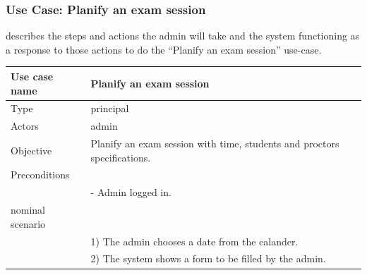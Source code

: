 \documentclass[]{uc2pfecaneva}
\begin{document}
    \begin{table}[t]
        \raggedright\subsubsection{Use Case: Planify an exam session}
        describes the steps and actions the admin will take and the system functioning as a response to
        those actions to do the “Planify an exam session” use-case.\linebreak \\
        \begin{tabularx}{\textwidth}{|l|X|}
            \hline
            Use case name         & Planify an exam session                                                                                                                                            \\ \hline
            Type                  & principal                                                                                                                                                         \\ \hline
            Actors                & admin                                                                                                                                                             \\ \hline
            Objective             & Planify an exam session with time, students and proctors specifications.                                                                                           \\ \hline
            Preconditions         &                                                                                                                                                                   \\
            & - Admin logged in.                                                                                                                                                \\\hline
            nominal scenario      &                                                                                                                                                                   \\
            & 1) The admin chooses a date from the calander.                                                                                                           \\
            & 2) The system shows a form to be filled by the admin.                                                                                                             \\

\end{tabularx}
\end{table}
\end{document}
